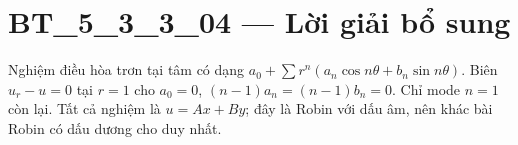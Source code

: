 \documentclass[10pt,a4paper]{article}
\begin{document}
\section*{BT\_5\_3\_3\_04 — Lời giải bổ sung}
Nghiệm điều hòa trơn tại tâm có dạng $a_0+\sum r^n(a_n\cos n\theta+b_n\sin n\theta)$. Biên $u_r-u=0$ tại $r=1$ cho $a_0=0$, $(n-1)a_n=(n-1)b_n=0$. Chỉ mode $n=1$ còn lại. Tất cả nghiệm là $u=Ax+By$; đây là Robin với dấu âm, nên khác bài Robin có dấu dương cho duy nhất.
\end{document}
